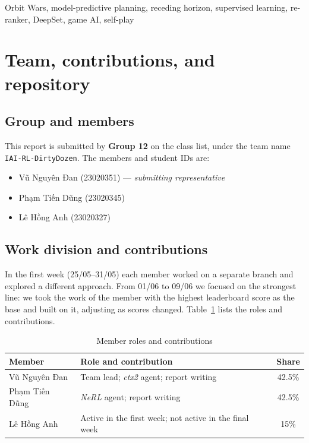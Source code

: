 \documentclass[conference]{IEEEtran}
\begin{document}
\begin{IEEEkeywords}
Orbit Wars, model-predictive planning, receding horizon, supervised learning, re-ranker, DeepSet, game AI, self-play
\end{IEEEkeywords}

\section{Team, contributions, and repository}
\label{sec:team}

\subsection{Group and members}
This report is submitted by \textbf{Group 12} on the class list, under the team name \texttt{IAI-RL-DirtyDozen}. The members and student IDs are:
\begin{itemize}
\item Vũ Nguyên Đan (23020351) --- \emph{submitting representative}
\item Phạm Tiến Dũng (23020345)
\item Lê Hồng Anh (23020327)
\end{itemize}

\subsection{Work division and contributions}
In the first week (25/05--31/05) each member worked on a separate branch and explored a different approach. From 01/06 to 09/06 we focused on the strongest line: we took the work of the member with the highest leaderboard score as the base and built on it, adjusting as scores changed. Table~\ref{tab:contrib} lists the roles and contributions.

\begin{table}[htbp]
\caption{Member roles and contributions}
\label{tab:contrib}
\centering
\small
\begin{tabular}{lp{4.4cm}c}
\toprule
\textbf{Member} & \textbf{Role and contribution} & \textbf{Share} \\
\midrule
Vũ Nguyên Đan & Team lead; \textit{ctx2} agent; report writing & 42.5\% \\
Phạm Tiến Dũng & \textit{NeRL} agent; report writing & 42.5\% \\
Lê Hồng Anh & Active in the first week; not active in the final week & 15\% \\
\bottomrule
\end{tabular}
\end{table}
\end{document}
